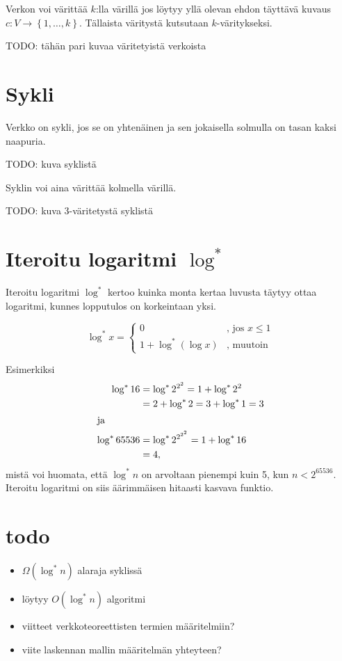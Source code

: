 \documentclass[finnish]{tktltiki2}
\theoremstyle{definition}
\theoremstyle{remark}
\newcommand{\set}[1]{\left\{ #1 \right\}}
\begin{document}
Verkon voi värittää $k$:lla värillä jos löytyy yllä olevan ehdon täyttävä
kuvaus $c : V \rightarrow \set{1,\dots,k}$. Tällaista väritystä kutsutaan
$k$-väritykseksi.

TODO: tähän pari kuvaa väritetyistä verkoista

\section{Sykli}

Verkko on sykli, jos se on yhtenäinen ja sen jokaisella solmulla on tasan kaksi
naapuria.

TODO: kuva syklistä

Syklin voi aina värittää kolmella värillä.

TODO: kuva 3-väritetystä syklistä

\section{Iteroitu logaritmi $\log^*$}

Iteroitu logaritmi $\log^*$ kertoo kuinka monta kertaa luvusta täytyy ottaa
logaritmi, kunnes lopputulos on korkeintaan yksi.

\begin{equation*}
    \log^* x =
      \begin{cases}
          0               &\text{, jos } x \leq 1 \\
          1 + \log^* (\log x) &\text{, muutoin}
      \end{cases}
\end{equation*}

Esimerkiksi
%
\begin{align*}
    \log^* 16 &= \log^* 2^{2^2} = 1 + \log^* 2^2 \\
              &= 2+ \log^* 2 = 3 + \log^* 1 = 3 \\
\intertext{ja}
    \log^* 65536 &= \log^* 2^{2^{2^2}} = 1 + \log^* 16 \\
                 &= 4,
\end{align*}
%
mistä voi huomata, että $\log^* n$ on arvoltaan pienempi kuin 5, kun $n <
2^{65536}$. Iteroitu logaritmi on siis äärimmäisen hitaasti kasvava funktio.

\section{todo}

\begin{itemize}
    \item $\Omega(\log^* n)$ alaraja syklissä
    \item löytyy $O(\log^* n)$ algoritmi
    \item viitteet verkkoteoreettisten termien määritelmiin?
    \item viite laskennan mallin määritelmän yhteyteen?
\end{itemize}
\end{document}
